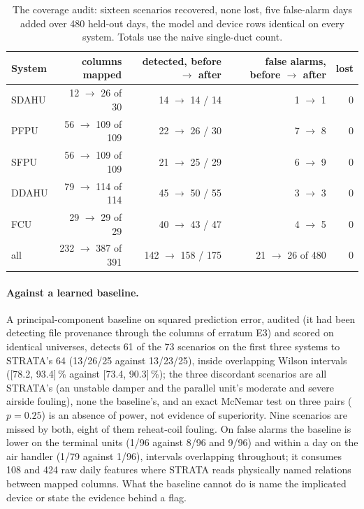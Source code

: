 \documentclass[11pt,letterpaper]{article}
\begin{document}
\begin{table}[t]
\centering
\footnotesize
\begin{tabular}{@{}lrrrr@{}}
\hline
System & columns mapped & detected, before $\to$ after & false alarms, before $\to$ after & lost \\
\hline
SDAHU & 12 $\to$ 26 of 30 & 14 $\to$ 14 / 14 & 1 $\to$ 1 & 0 \\
PFPU & 56 $\to$ 109 of 109 & 22 $\to$ 26 / 30 & 7 $\to$ 8 & 0 \\
SFPU & 56 $\to$ 109 of 109 & 21 $\to$ 25 / 29 & 6 $\to$ 9 & 0 \\
DDAHU & 79 $\to$ 114 of 114 & 45 $\to$ 50 / 55 & 3 $\to$ 3 & 0 \\
FCU & 29 $\to$ 29 of 29 & 40 $\to$ 43 / 47 & 4 $\to$ 5 & 0 \\
\hline
all & 232 $\to$ 387 of 391 & 142 $\to$ 158 / 175 & 21 $\to$ 26 of 480 & 0 \\
\hline
\end{tabular}
\caption{The coverage audit: sixteen scenarios recovered, none lost, five false-alarm days added over 480 held-out days, the model and device rows identical on every system. Totals use the naive single-duct count.}
\label{tab:coverage}
\end{table}

\paragraph{Against a learned baseline.} A principal-component baseline on squared prediction error, audited (it had been detecting file provenance through the columns of erratum E3) and scored on identical universes, detects 61 of the 73 scenarios on the first three systems to STRATA's 64 (13/26/25 against 13/23/25), inside overlapping Wilson intervals ([78.2, 93.4]\,\% against [73.4, 90.3]\,\%); the three discordant scenarios are all STRATA's (an unstable damper and the parallel unit's moderate and severe airside fouling), none the baseline's, and an exact McNemar test on three pairs ($p = 0.25$) is an absence of power, not evidence of superiority. Nine scenarios are missed by both, eight of them reheat-coil fouling. On false alarms the baseline is lower on the terminal units (1/96 against 8/96 and 9/96) and within a day on the air handler (1/79 against 1/96), intervals overlapping throughout; it consumes 108 and 424 raw daily features where STRATA reads physically named relations between mapped columns. What the baseline cannot do is name the implicated device or state the evidence behind a flag.
\end{document}

